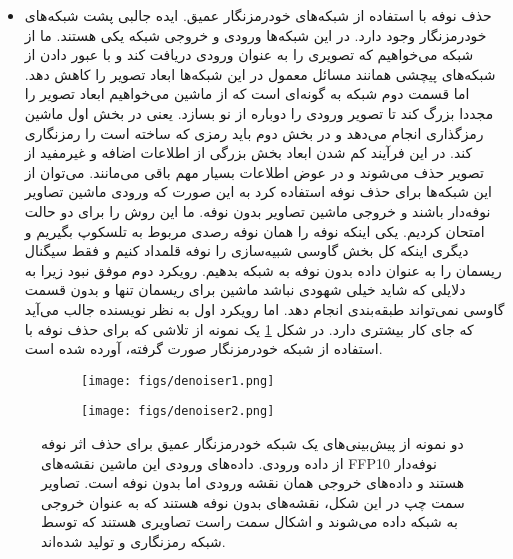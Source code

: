 {\begin{itemize}
	علاوه بر حذف نوفه گاوسی به حفظ لبه‌ها در تصویر کمک می‌کند. این فیلترهای گاوسی در opencv 
	که بسته نرم‌افزاری برای پردازش تصویر است قابل دسترسی است. 
	\item
	حذف نوفه با استفاده از شبکه‌های خودرمزنگار
	عمیق. ایده جالبی پشت شبکه‌های خودرمزنگار وجود دارد. در این شبکه‌ها ورودی و خروجی شبکه یکی هستند. ما از شبکه می‌خواهیم که تصویری را به عنوان ورودی دریافت کند و با عبور دادن از شبکه‌های پیچشی همانند مسائل معمول در این شبکه‌ها ابعاد تصویر را کاهش دهد. اما قسمت دوم شبکه به گونه‌ای است که از ماشین می‌خواهیم ابعاد تصویر را مجددا بزرگ کند تا تصویر ورودی را دوباره از نو بسازد. یعنی در بخش اول ماشین رمزگذاری انجام می‌دهد و در بخش دوم باید رمزی که ساخته است را رمزنگاری کند. در این فرآیند کم شدن ابعاد بخش بزرگی از اطلاعات اضافه و غیرمفید از تصویر حذف می‌شوند و در عوض اطلاعات بسیار مهم باقی می‌مانند. می‌توان از این شبکه‌ها برای حذف نوفه استفاده کرد به این صورت که ورودی ماشین تصاویر نوفه‌دار باشند و خروجی ماشین تصاویر بدون نوفه. ما این روش را برای دو حالت امتحان کردیم. یکی اینکه نوفه را همان نوفه رصدی مربوط به تلسکوپ بگیریم و دیگری اینکه کل بخش گاوسی شبیه‌سازی را نوفه قلمداد کنیم و فقط سیگنال ریسمان را به عنوان داده بدون نوفه به شبکه بدهیم. رویکرد دوم موفق نبود زیرا به دلایلی که شاید خیلی شهودی نباشد ماشین برای ریسمان تنها و بدون قسمت گاوسی نمی‌تواند طبقه‌بندی انجام دهد. اما رویکرد اول به نظر نویسنده جالب می‌آید که جای کار بیشتری دارد. در شکل 
	\ref{fig:denoiser}
	یک نمونه از تلاشی که برای حذف نوفه با استفاده از شبکه خودرمزنگار صورت گرفته، آورده شده است.      
\end{itemize}


\begin{figure}[h!]
	\centering
	\begin{subfigure}{\textwidth}
		\centering
		\texttt{[image: figs/denoiser1.png]}
	\end{subfigure}
	\begin{subfigure}{\textwidth}
		\centering
		\texttt{[image: figs/denoiser2.png]}
	\end{subfigure}
	
	\caption{
		دو نمونه‌ از پیش‌بینی‌های‌ یک شبکه خودرمزنگار عمیق برای حذف اثر نوفه از داده ورودی. داده‌های ورودی این ماشین نقشه‌های FFP10 نوفه‌دار هستند و داده‌های خروجی همان نقشه ورودی اما بدون نوفه است. تصاویر سمت چپ در این شکل، نقشه‌های بدون نوفه هستند که به عنوان خروجی به شبکه داده می‌شوند و اشکال سمت راست تصاویری هستند که توسط شبکه رمزنگاری و تولید شده‌اند.
	} 
	\label{fig:denoiser}
\end{figure}

}
